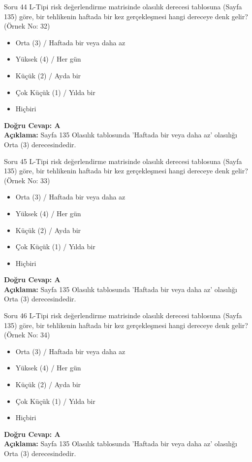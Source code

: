 \documentclass[12pt,a4paper]{article}
\begin{document}
\begin{testcard}{Soru 44}
    L-Tipi risk değerlendirme matrisinde olasılık derecesi tablosuna (Sayfa 135) göre, bir tehlikenin haftada bir kez gerçekleşmesi hangi dereceye denk gelir? (Örnek No: 32)
    \begin{itemize}
        \item[A)] Orta (3) / Haftada bir veya daha az
        \item[B)] Yüksek (4) / Her gün
        \item[C)] Küçük (2) / Ayda bir
        \item[D)] Çok Küçük (1) / Yılda bir
        \item[E)] Hiçbiri
    \end{itemize}
    \tcblower
    \textbf{Doğru Cevap: A} \\
    \textbf{Açıklama:} Sayfa 135 Olasılık tablosunda 'Haftada bir veya daha az' olasılığı Orta (3) derecesindedir.
\end{testcard}

\begin{testcard}{Soru 45}
    L-Tipi risk değerlendirme matrisinde olasılık derecesi tablosuna (Sayfa 135) göre, bir tehlikenin haftada bir kez gerçekleşmesi hangi dereceye denk gelir? (Örnek No: 33)
    \begin{itemize}
        \item[A)] Orta (3) / Haftada bir veya daha az
        \item[B)] Yüksek (4) / Her gün
        \item[C)] Küçük (2) / Ayda bir
        \item[D)] Çok Küçük (1) / Yılda bir
        \item[E)] Hiçbiri
    \end{itemize}
    \tcblower
    \textbf{Doğru Cevap: A} \\
    \textbf{Açıklama:} Sayfa 135 Olasılık tablosunda 'Haftada bir veya daha az' olasılığı Orta (3) derecesindedir.
\end{testcard}

\begin{testcard}{Soru 46}
    L-Tipi risk değerlendirme matrisinde olasılık derecesi tablosuna (Sayfa 135) göre, bir tehlikenin haftada bir kez gerçekleşmesi hangi dereceye denk gelir? (Örnek No: 34)
    \begin{itemize}
        \item[A)] Orta (3) / Haftada bir veya daha az
        \item[B)] Yüksek (4) / Her gün
        \item[C)] Küçük (2) / Ayda bir
        \item[D)] Çok Küçük (1) / Yılda bir
        \item[E)] Hiçbiri
    \end{itemize}
    \tcblower
    \textbf{Doğru Cevap: A} \\
    \textbf{Açıklama:} Sayfa 135 Olasılık tablosunda 'Haftada bir veya daha az' olasılığı Orta (3) derecesindedir.
\end{testcard}
\end{document}
